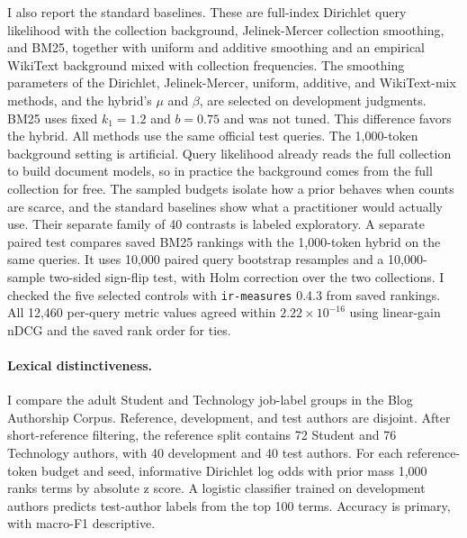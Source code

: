 \documentclass[11pt]{article}
\begin{document}
I also report the standard baselines. These are full-index Dirichlet query
likelihood with the collection background, Jelinek-Mercer collection
smoothing, and BM25, together with uniform and additive smoothing and an
empirical WikiText background mixed with collection frequencies. The
smoothing parameters of the Dirichlet, Jelinek-Mercer, uniform, additive, and
WikiText-mix methods, and the hybrid's $\mu$ and $\beta$, are selected on
development judgments. BM25 uses fixed $k_1=1.2$ and $b=0.75$ and was not
tuned. This difference favors the hybrid. All methods use the same official
test queries. The 1,000-token background setting is artificial. Query likelihood
already reads the full collection to build document models, so in practice
the background comes from the full collection for free. The sampled budgets
isolate how a prior behaves when counts are scarce, and the standard
baselines show what a practitioner would actually use. Their
separate family of 40 contrasts is labeled exploratory. A separate paired test compares saved BM25
rankings with the 1,000-token hybrid on the same queries. It uses 10,000
paired query bootstrap resamples and a 10,000-sample two-sided sign-flip test,
with Holm correction over the two collections. I checked the five
selected controls with \texttt{ir-measures} 0.4.3 \citep{macavaney2022irmeasures}
from saved rankings. All 12,460 per-query metric values agreed within
$2.22\times10^{-16}$ using linear-gain nDCG and the saved rank order for ties.

\paragraph{Lexical distinctiveness.} I compare the adult Student and
Technology job-label groups in the Blog Authorship Corpus. Reference,
development, and test authors are disjoint. After short-reference filtering,
the reference split contains 72 Student and 76 Technology authors, with 40
development and 40 test authors. For each reference-token budget and seed,
informative Dirichlet log odds with prior mass 1,000 ranks terms by absolute z
score. A logistic classifier trained on development authors predicts
test-author labels from the top 100 terms. Accuracy is primary, with macro-F1
descriptive.
\end{document}
